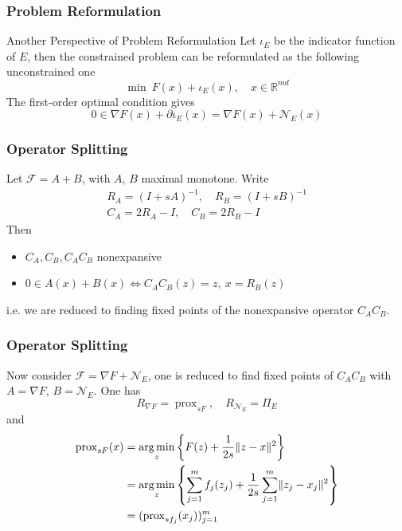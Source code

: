 
\begin{frame}
\frametitle{Problem Reformulation}

\begin{block}{Another Perspective of Problem Reformulation}
Let $\iota_E$ be the indicator function of $E$, then the constrained problem can be reformulated as the following unconstrained one
$$\min \ F(x) + \iota_E(x), \quad x \in \mathbb{R}^{md}$$
The first-order optimal condition gives
$$0 \in \nabla F(x) + \partial \iota_E(x) = \nabla F(x) + \mathcal{N}_E(x)$$
\end{block}

\end{frame}


\begin{frame}
\frametitle{Operator Splitting}

Let $\mathcal{F} = A+B$, with $A$, $B$ maximal monotone. Write
\begin{gather*}
R_A = (I + s A)^{-1}, \quad R_B = (I + s B)^{-1} \\
C_A = 2R_A - I, \quad C_B = 2R_B - I
\end{gather*}
Then
\begin{itemize}
    \item $C_A, C_B, C_AC_B$ nonexpansive
    \item $0\in A(x)+B(x) \Longleftrightarrow C_AC_B(z) = z, \ x = R_B(z)$
\end{itemize}
i.e. we are reduced to finding fixed points of the nonexpansive operator $ C_AC_B$.

\end{frame}


\begin{frame}
\frametitle{Operator Splitting}

Now consider $\mathcal{F} = \nabla F + \mathcal{N}_E$, one is reduced to find fixed points of $C_AC_B$ with $A = \nabla F$, $B = \mathcal{N}_E$. One has
$$R_{\nabla F} = \operatorname{prox}_{sF}, \quad R_{\mathcal{N}_E} = \Pi_{E}$$
and
\begin{align*}
\operatorname{prox}_{sF}(x) & = \operatorname*{arg\,min}_z \left\{ F(z) + \frac{1}{2s} \lVert z-x \rVert^2 \right\} \\
& = \operatorname*{arg\,min}_z \left\{ \sum_{j=1}^m f_j(z_j) + \frac{1}{2s} \sum_{j=1}^m \lVert z_j-x_j \rVert^2 \right\} \\
& = (\operatorname{prox}_{sf_j}(x_j))_{j=1}^m
\end{align*}

\end{frame}


